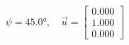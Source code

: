 \documentclass[preview]{standalone}
\begin{document}
\begin{align*}
\psi = 45.0\text{°}, \quad \vec{u} = \begin{bmatrix} 0.000 \\ 1.000 \\ 0.000 \end{bmatrix}
\end{align*}
\end{document}
